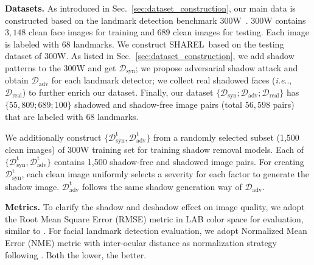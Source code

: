 \documentclass[10pt,twocolumn,letterpaper]{article}
\makeatletter
\def\ourmethod{{SHAREL}~}
\newcommand{\secref}[1]{Sec.~\ref{#1}}
\DeclareRobustCommand\onedot{\futurelet\@let@token\@onedot}
\def\@onedot{\ifx\@let@token.\else.\null\fi\xspace}
\def\ie{\emph{i.e}\onedot} \def\Ie{\emph{I.e}\onedot}
\renewcommand{\paragraph}[1]{\vspace{1.25mm}\noindent\textbf{#1}}
\makeatother
\begin{document}
\paragraph{Datasets.} 
As introduced in \secref{sec:dataset_construction}, our main data is constructed based on the landmark detection benchmark 300W~\cite{sagonas2013300}.
%
300W contains $3,148$ clean face images for training and $689$ clean images for testing. 
Each image is labeled with 68 landmarks.
%
We construct \ourmethod based on the testing dataset of 300W. As listed in \secref{sec:dataset_construction}, we add shadow patterns to the 300W and get $\mathcal{D}_\text{syn}$; we propose adversarial shadow attack and obtain $\mathcal{D}_\text{adv}$ for each landmark detector; we collect real shadowed faces (\ie, $\mathcal{D}_\text{real}$) to further enrich our dataset.
%
Finally, our dataset $\{\mathcal{D}_\text{syn}; \mathcal{D}_\text{adv}; \mathcal{D}_\text{real}\}$ has 
$\{55,809; 689; 100\}$ shadowed and shadow-free image pairs (total $56,598$ pairs) that are labeled with 68 landmarks.
 

We additionally construct $\{\mathcal{D}^\text{t}_\text{syn}, \mathcal{D}^\text{t}_\text{adv}\}$ from a randomly selected subset (1,500 clean images) of 300W training set for training shadow removal models. Each of $\{\mathcal{D}^\text{t}_\text{syn}, \mathcal{D}^\text{t}_\text{adv}\}$ contains 1,500 shadow-free and shadowed image pairs. For creating $\mathcal{D}^\text{t}_\text{syn}$, each clean image uniformly selects a severity for each factor to generate the shadow image. $\mathcal{D}^\text{t}_\text{adv}$
follows the same shadow generation way of $\mathcal{D}_\text{adv}$.

\paragraph{Metrics.}
%
To clarify the shadow and deshadow effect on image quality, we adopt the Root Mean Square Error (RMSE) metric in LAB color space for evaluation, similar to \cite{fu2021auto,le2019shadow,hu2019mask}. 
For facial landmark detection evaluation, we adopt Normalized Mean Error (NME) metric with inter-ocular distance as normalization strategy following \cite{kumar2020luvli,dong2018style,wang2020deep}. Both the lower, the better.
%
\end{document}
